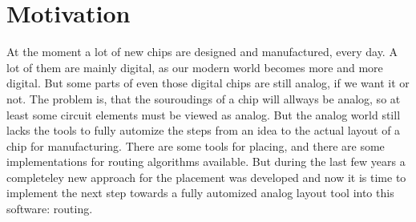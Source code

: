 \chapter{Motivation}
At the moment a lot of new chips are designed and manufactured, every day. A lot of them are mainly digital, as our modern world becomes more and more digital. But some parts of even those digital chips are still analog, if we want it or not. The problem is, that the souroudings of a chip will allways be analog, so at least some circuit elements must be viewed as analog. But the analog world still lacks the tools to fully automize the steps from an idea to the actual layout of a chip for manufacturing. There are some tools for placing, and there are some implementations for routing algorithms available. But during the last few years a completeley new approach for the placement was developed and now it is time to implement the next step towards a fully automized analog layout tool into this software: routing.